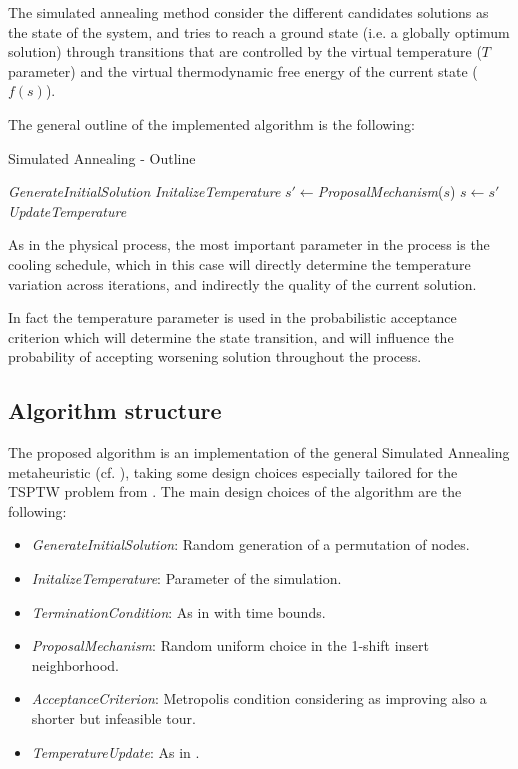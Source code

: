 \begin{homeworkProblem}
The simulated annealing method consider the different candidates solutions as the state of the system, and tries to reach a ground state (i.e. a globally optimum solution) through transitions that are controlled by the virtual temperature ($T$ parameter) and the virtual thermodynamic free energy of the current state ($f(s)$).

The general outline of the implemented algorithm is the following: 

\begin{algorithm}[!h]
  \caption{Simulated Annealing - Outline}\label{sa:outline}
  \begin{algorithmic}[1]
    \State \emph{GenerateInitialSolution}
    \State \emph{InitalizeTemperature} 
        \State $s' \gets $\emph{ProposalMechanism}($s$)
          \State $s \gets s'$
        \EndIf
        \State \emph{UpdateTemperature}
    \EndWhile
\end{algorithmic}
\end{algorithm}

As in the physical process, the most important parameter in the process is the cooling schedule, which in this case will  directly determine the temperature variation across iterations, and indirectly the quality of the current solution.

In fact the temperature parameter is used in the probabilistic acceptance criterion which will determine the state transition, and will influence the probability of accepting worsening solution throughout the process.  

\subsection{Algorithm structure} \label{sec:algstrucSA}
The proposed algorithm is an implementation of the general Simulated Annealing metaheuristic (cf. \cite{kirkpatrick1983optimization}), taking some design choices especially tailored for the TSPTW problem from \cite{ohlmann2007compressed}.
The main design choices of the algorithm are the following:
\begin{itemize}
  \item \emph{GenerateInitialSolution}: Random generation of a permutation of nodes.
  \item \emph{InitalizeTemperature}: Parameter of the simulation.
  \item \emph{TerminationCondition}: As in \cite{ohlmann2007compressed} with time bounds.
  \item \emph{ProposalMechanism}: Random uniform choice in the 1-shift insert neighborhood.
  \item \emph{AcceptanceCriterion}: Metropolis condition considering as improving also a shorter but infeasible tour.
  \item \emph{TemperatureUpdate}: As in \cite{ohlmann2007compressed}.
\end{itemize}


\end{homeworkProblem}
